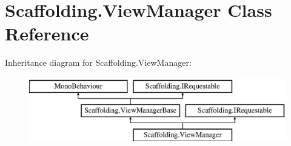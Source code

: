 \hypertarget{class_scaffolding_1_1_view_manager}{\section{Scaffolding.\+View\+Manager Class Reference}
\label{class_scaffolding_1_1_view_manager}
}
Inheritance diagram for Scaffolding.\+View\+Manager\+:\begin{figure}[H]
\begin{center}
\leavevmode
\includegraphics[height=2.871795cm]{class_scaffolding_1_1_view_manager}
\end{center}
\end{figure}
